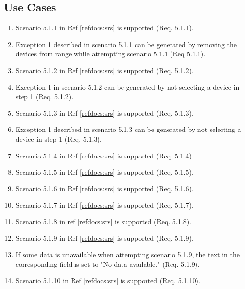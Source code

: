 \documentclass[a4paper]{article}
\newlength{\testlabellength}
\newenvironment{testlist}{\begin{enumerate}[label=\bfseries Instruction \thesubsection.\arabic* , labelindent=0pt, labelwidth=\testlabellength , leftmargin=2cm]}{\end{enumerate}}
\begin{document}
\begin{appendices}
\subsection{Use Cases}
\begin{testlist}
	\item Scenario 5.1.1 in Ref \ref{refdocs:srs} is supported (Req. 5.1.1).

	\item Exception 1 described in scenario 5.1.1 can be generated by removing the devices from range while attempting scenario 5.1.1 (Req 5.1.1).
	
	\item Scenario 5.1.2 in Ref \ref{refdocs:srs} is supported (Req. 5.1.2).
	
	\item Exception 1 in scenario 5.1.2 can be generated by not selecting a device in step 1 (Req. 5.1.2).
	
	\item Scenario 5.1.3 in Ref \ref{refdocs:srs} is supported (Req. 5.1.3).
	
	\item Exception 1 described in scenario 5.1.3 can be generated by not selecting a device in step 1 (Req. 5.1.3). 
	
	\item Scenario 5.1.4 in Ref \ref{refdocs:srs} is supported (Req. 5.1.4).
	
	\item Scenario 5.1.5 in Ref \ref{refdocs:srs} is supported (Req. 5.1.5).
	
	\item Scenario 5.1.6 in Ref \ref{refdocs:srs} is supported (Req. 5.1.6).
	
	\item Scenario 5.1.7 in Ref \ref{refdocs:srs} is supported (Req. 5.1.7).
	
	\item Scenario 5.1.8 in ref \ref{refdocs:srs} is supported (Req. 5.1.8).

	\item Scenario 5.1.9 in Ref \ref{refdocs:srs} is supported (Req. 5.1.9).
	
	\item If some data is unavailable when attempting scenario 5.1.9, the text in the corresponding field is set to "No data available." (Req. 5.1.9).
	
	\item Scenario 5.1.10 in Ref \ref{refdocs:srs} is supported (Req. 5.1.10).
	

\end{testlist}
\end{appendices}
\end{document}
